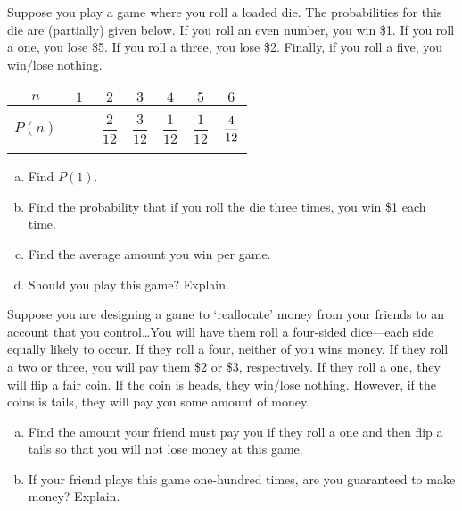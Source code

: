 \documentclass[11pt,letterpaper]{article}
\begin{document}

 Suppose you play a game where you roll a loaded die. The probabilities for this die are (partially) given below. If you roll an even number, you win \$1. If you roll a one, you lose \$5. If you roll a three, you lose \$2. Finally, if you roll a five, you win/lose nothing. 
	\begin{table}[!ht]
	\centering 
	\begin{tabular}{|c||c|c|c|c|c|c|} \hline 
	$n$ & $1$ & $2$ & $3$ & $4$ & $5$ & $6$ \\ \hline 
	$P(n)$ & $\phantom{\dfrac{00}{00}}$ & $\dfrac{2}{12}$ & $\dfrac{3}{12}$ & $\dfrac{1}{12}$ & $\dfrac{1}{12}$ & $\dfrac{4\rule{0pt}{2.9ex}}{12\rule[-1.3ex]{0pt}{0pt}}$ \\ \hline
	\end{tabular}
	\end{table}

\begin{enumerate}[(a)]
\item Find $P(1)$. 
\item Find the probability that if you roll the die three times, you win \$1 each time. 
\item Find the average amount you win per game. 
\item Should you play this game? Explain.
\end{enumerate}



\newpage



 Suppose you are designing a game to `reallocate' money from your friends to an account that you control\dots You will have them roll a four-sided dice---each side equally likely to occur. If they roll a four, neither of you wins money. If they roll a two or three, you will pay them \$2 or \$3, respectively. If they roll a one, they will flip a fair coin. If the coin is heads, they win/lose nothing. However, if the coins is tails, they will pay you some amount of money. 
	\begin{enumerate}[(a)]
	\item Find the amount your friend must pay you if they roll a one and then flip a tails so that you will not lose money at this game. 
	\item If your friend plays this game one-hundred times, are you guaranteed to make money? Explain. 
	\end{enumerate}
\end{document}
